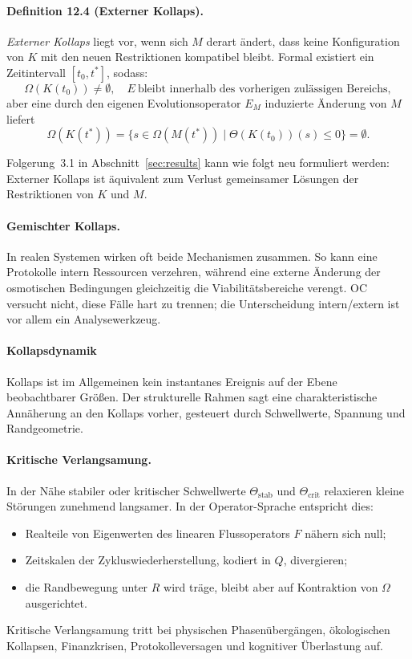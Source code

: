 \paragraph{Definition 12.4 (Externer Kollaps).}
\emph{Externer Kollaps} liegt vor, wenn sich \(M\) derart ändert, dass keine
Konfiguration von \(K\) mit den neuen Restriktionen kompatibel bleibt.
Formal existiert ein Zeitintervall \([t_0,t^{\ast}]\), sodass:
\[
  \Omega(K(t_0))\neq\emptyset,
  \quad
  E\ \text{bleibt innerhalb des vorherigen zulässigen Bereichs},
\]
aber eine durch den eigenen Evolutionsoperator \(E_M\) induzierte Änderung von
\(M\) liefert
\[
  \Omega(K(t^{\ast})) =
    \big\{ s \in \Omega(M(t^{\ast})) \mid
           \Theta(K(t_0))(s)\le 0 \big\} = \emptyset.
\]

Folgerung~3.1 in Abschnitt~\ref{sec:results} kann wie folgt neu formuliert
werden: Externer Kollaps ist äquivalent zum Verlust gemeinsamer Lösungen der
Restriktionen von \(K\) und \(M\).

\paragraph{Gemischter Kollaps.}
In realen Systemen wirken oft beide Mechanismen zusammen. So kann eine
Protokolle intern Ressourcen verzehren, während eine externe Änderung der
osmotischen Bedingungen gleichzeitig die Viabilitätsbereiche verengt.
OC versucht nicht, diese Fälle hart zu trennen; die Unterscheidung intern/extern
ist vor allem ein Analysewerkzeug.

\paragraph{Kollapsdynamik}

Kollaps ist im Allgemeinen kein instantanes Ereignis auf der Ebene beobachtbarer
Größen. Der strukturelle Rahmen sagt eine charakteristische Annäherung an den
Kollaps vorher, gesteuert durch Schwellwerte, Spannung und Randgeometrie.

\paragraph{Kritische Verlangsamung.}
In der Nähe stabiler oder kritischer Schwellwerte \(\Theta_{\mathrm{stab}}\) und
\(\Theta_{\mathrm{crit}}\) relaxieren kleine Störungen zunehmend langsamer.
In der Operator-Sprache entspricht dies:
\begin{itemize}
  \item Realteile von Eigenwerten des linearen Flussoperators \(F\) nähern sich
        null;
  \item Zeitskalen der Zykluswiederherstellung, kodiert in \(Q\), divergieren;
  \item die Randbewegung unter \(R\) wird träge, bleibt aber auf Kontraktion von
        \(\Omega\) ausgerichtet.
\end{itemize}
Kritische Verlangsamung tritt bei physischen Phasenübergängen, ökologischen
Kollapsen, Finanzkrisen, Protokolleversagen und kognitiver Überlastung auf.


